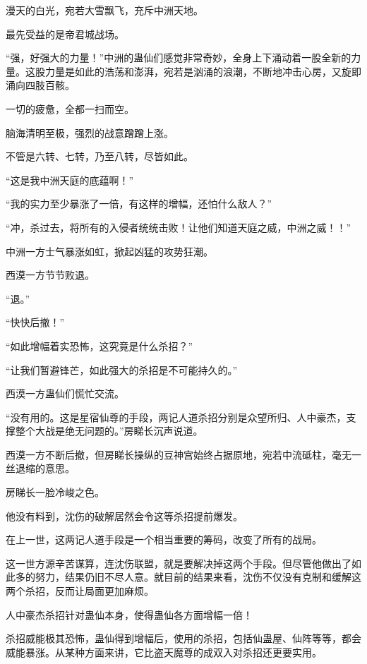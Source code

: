 
\begin{this_body}

漫天的白光，宛若大雪飘飞，充斥中洲天地。

最先受益的是帝君城战场。

“强，好强大的力量！”中洲的蛊仙们感觉非常奇妙，全身上下涌动着一股全新的力量。这股力量是如此的浩荡和澎湃，宛若是汹涌的浪潮，不断地冲击心房，又旋即涌向四肢百骸。

一切的疲惫，全都一扫而空。

脑海清明至极，强烈的战意蹭蹭上涨。

不管是六转、七转，乃至八转，尽皆如此。

“这是我中洲天庭的底蕴啊！”

“我的实力至少暴涨了一倍，有这样的增幅，还怕什么敌人？”

“冲，杀过去，将所有的入侵者统统击败！让他们知道天庭之威，中洲之威！！”

中洲一方士气暴涨如虹，掀起凶猛的攻势狂潮。

西漠一方节节败退。

“退。”

“快快后撤！”

“如此增幅着实恐怖，这究竟是什么杀招？”

“让我们暂避锋芒，如此强大的杀招是不可能持久的。”

西漠一方蛊仙们慌忙交流。

“没有用的。这是星宿仙尊的手段，两记人道杀招分别是众望所归、人中豪杰，支撑整个大战是绝无问题的。”房睇长沉声说道。

西漠一方不断后撤，但房睇长操纵的豆神宫始终占据原地，宛若中流砥柱，毫无一丝退缩的意思。

房睇长一脸冷峻之色。

他没有料到，沈伤的破解居然会令这等杀招提前爆发。

在上一世，这两记人道手段是一个相当重要的筹码，改变了所有的战局。

这一世方源辛苦谋算，连沈伤联盟，就是要解决掉这两个手段。但尽管他做出了如此多的努力，结果仍旧不尽人意。就目前的结果来看，沈伤不仅没有克制和缓解这两个杀招，反而让局面更加麻烦。

人中豪杰杀招针对蛊仙本身，使得蛊仙各方面增幅一倍！

杀招威能极其恐怖，蛊仙得到增幅后，使用的杀招，包括仙蛊屋、仙阵等等，都会威能暴涨。从某种方面来讲，它比盗天魔尊的成双入对杀招还更要实用。


\end{this_body}
